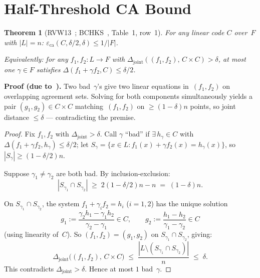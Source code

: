 \documentclass[11pt]{article}
\newtheorem{theorem}{Theorem}
\begin{document}
\section{Half-Threshold CA Bound}
\label{sec:ca}

\begin{theorem}[RVW13~\cite{RVW}; BCHKS~\cite{BCHKS}, Table~1, row~1]
\label{thm:ca-halved}
For any linear code $C$ over~$F$ with $|L| = n$:
$\varepsilon_{\mathrm{ca}}(C, \delta/2, \delta) \leq 1/|F|$.

Equivalently: for any $f_1, f_2 : L \to F$ with $\Delta_{\mathrm{joint}}((f_1, f_2),\, C \times C) > \delta$, at most one $\gamma \in F$ satisfies $\Delta(f_1 + \gamma f_2, C) \leq \delta/2$.
\end{theorem}

\noindent\textbf{Proof (due to~\cite{RVW}).} Two bad~$\gamma$'s give two linear equations in~$(f_1, f_2)$ on overlapping agreement sets. Solving for both components simultaneously yields a pair $(g_1, g_2) \in C \times C$ matching~$(f_1, f_2)$ on $\geq (1{-}\delta)n$ points, so joint distance $\leq \delta$ --- contradicting the premise.

\begin{proof}
Fix $f_1, f_2$ with $\Delta_{\mathrm{joint}} > \delta$. Call $\gamma$ ``bad'' if $\exists\, h_\gamma \in C$ with $\Delta(f_1 + \gamma f_2, h_\gamma) \leq \delta/2$; let $S_\gamma = \{x \in L : f_1(x) + \gamma f_2(x) = h_\gamma(x)\}$, so $|S_\gamma| \geq (1-\delta/2)n$.

Suppose $\gamma_1 \neq \gamma_2$ are both bad. By inclusion-exclusion:
$$|S_{\gamma_1} \cap S_{\gamma_2}| \;\geq\; 2(1-\delta/2)n - n \;=\; (1-\delta)n.$$

On $S_{\gamma_1} \cap S_{\gamma_2}$, the system $f_1 + \gamma_i f_2 = h_i$ ($i = 1, 2$) has the unique solution
$$g_1 := \frac{\gamma_2 h_1 - \gamma_1 h_2}{\gamma_2 - \gamma_1} \in C, \qquad g_2 := \frac{h_1 - h_2}{\gamma_1 - \gamma_2} \in C$$
(using linearity of~$C$). So $(f_1, f_2) = (g_1, g_2)$ on $S_{\gamma_1} \cap S_{\gamma_2}$, giving:
$$\Delta_{\mathrm{joint}}\bigl((f_1, f_2),\, C \times C\bigr) \;\leq\; \frac{|L \setminus (S_{\gamma_1} \cap S_{\gamma_2})|}{n} \;\leq\; \delta.$$
This contradicts $\Delta_{\mathrm{joint}} > \delta$. Hence at most $1$ bad~$\gamma$.
\end{proof}
\end{document}
